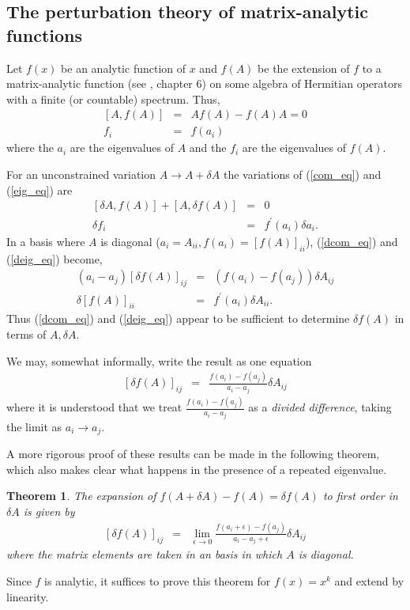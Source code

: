 \documentclass{article}
\newcommand{\beas}{\begin{eqnarray*}}
\newcommand{\enas}{\end{eqnarray*}}
\newcommand{\bea}{\begin{eqnarray}} \newcommand{\ena}{\end{eqnarray}}
\newtheorem{theorem}{Theorem}[section]
\begin{document}
\subsection{The perturbation theory of matrix-analytic functions}

\label{pert_sec}
Let $f(x)$ be an analytic function of $x$ and $f(A)$ be the
extension of $f$ to a matrix-analytic function
(see \cite{HornJohnson.book:91}, chapter 6) on some algebra of
Hermitian operators with a finite (or countable) spectrum.  Thus,
\bea
\label{com_eq}
 [A, f(A)] &=& A f(A) - f(A) A = 0\\
\label{eig_eq}
 f_i &=& f(a_i)
\ena
where the $a_i$ are the eigenvalues of $A$ and the $f_i$ are
the eigenvalues of $f(A)$.

For an unconstrained variation $A \rightarrow A + \delta A$
the variations of (\ref{com_eq}) and (\ref{eig_eq}) are
\bea
\label{dcom_eq}
 [\delta A, f(A)]+[A, \delta f(A)] &=& 0\\
\label{deig_eq}
 \delta f_i &=& f^\prime (a_i) \delta a_i.
\ena
In a basis where $A$ is diagonal
($a_i = A_{ii}, f(a_i) = \left[f(A)\right]_{ii}$),
(\ref{dcom_eq}) and (\ref{deig_eq}) become,
\bea
\label{ddcom_eq}
 (a_i - a_j) \left[\delta f(A)\right]_{ij} &=&  (f(a_i) - f(a_j)) \delta A_{ij}\\
\label{ddeig_eq}
 \delta \left[f(A)\right]_{ii} &=& f^\prime (a_i) \delta A_{ii}.
\ena
Thus (\ref{dcom_eq}) and (\ref{deig_eq})
appear to be sufficient to determine $\delta f(A)$ in terms of $A,\delta A$.

We may, somewhat informally, write the result as one equation
\bea
\label{jac_eq}
 \left[\delta f(A)\right]_{ij} &=& \frac{f(a_i) - f(a_j)}{a_i - a_j} \delta A_{ij}
\ena
where it is understood that we treat
$\frac{f(a_i) - f(a_j)}{a_i - a_j}$
as a {\em divided difference}, taking the limit as $a_i \rightarrow a_j$.

A more rigorous proof of these results can be made in the following theorem,
which also makes clear what happens in the presence of a repeated eigenvalue.
\begin{theorem}
The expansion of $f(A + \delta A) - f(A) = \delta f(A)$
 to first order in $\delta A$ is given by
\beas
\left[ \delta f(A) \right]_{ij} 
&=& \lim_{\epsilon\rightarrow 0}
     \frac{f(a_i+\epsilon) - f(a_j)}{a_i - a_j+\epsilon}
     \delta A_{ij} %
\enas
where the matrix elements are taken in an basis in which
$A$ is diagonal.
\end{theorem}
\proof
Since $f$ is analytic, it suffices to prove this theorem for
$f(x) = x^k$ and extend by linearity.
\end{document}
